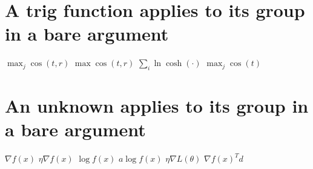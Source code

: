 \documentclass{article}
\begin{document}
\section{A trig function applies to its group in a bare argument}
$\max_{j}\cos(t,r)$ $\max\cos(t,r)$ $\sum_{i}\ln\cosh(\cdot)$ $\max_{j}\cos(t)$

\section{An unknown applies to its group in a bare argument}
$\nabla f(x)$ $\eta\nabla f(x)$ $\log f(x)$ $a\log f(x)$ $\eta\nabla L(\theta)$ $\nabla f(x)^{T}d$
\end{document}
